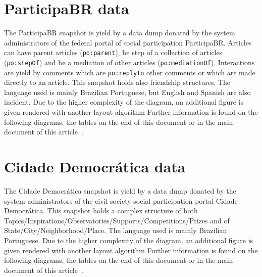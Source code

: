 \documentclass[review]{elsarticle}
\newcommand{\textttt}[1] {\texttt{\footnotesize#1}}
\begin{document}
\section{ParticipaBR data}
The ParticipaBR snapshot is yield by a data dump donated by the system
administrators of the federal portal of social participation ParticipaBR.
Articles can have parent articles (\textttt{po:parent}), be step of a
collection of articles (\textttt{po:stepOf}) and be a mediation of other
articles (\textttt{po:mediationOf}).
Interactions are yield by comments which are \textttt{po:replyTo} other
comments or which are made directly to an article.
This snapshot holds also friendship structures.
The language used is mainly Brazilian Portuguese, but English and
Spanish are also incident.
Due to the higher complexity of the diagram, an additional figure is
given rendered with another layout algorithm
Further information is found on the following diagrams, the tables on
the end of this document or in the main document of this
article~\cite{losd}.

\section{Cidade Democrática data}
The Cidade Democrática snapshot is yield by a data dump donated by the system
administrators of the civil society social participation portal Cidade
Democrática.
This snapshot holds a complex structure of both
Topics/Inspirations/Observatories/Supports/Competitions/Prizes
and of State/City/Neighborhood/Place.
The language used is mainly Brazilian Portuguese.
Due to the higher complexity of the diagram, an additional figure is
given rendered with another layout algorithm
Further information is found on the following diagrams, the tables on
the end of this document or in the main document of this
article~\cite{losd}.
\end{document}
